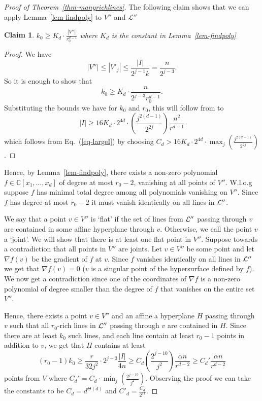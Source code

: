 \documentclass[11pt]{article}
\newtheorem{claim}[thm]{Claim}
\def\L{{\mathcal L}}
\def\C{{\mathbb{C}}}
\def\cL{{\cal L}}
\begin{document}
\begin{proof}[Proof of Theorem~\ref{thm-manyrichlines}]
The following claim shows that we can apply Lemma~\ref{lem-findpoly} to $V''$ and $\L''$
\begin{claim} $k_0\ge K_d\cdot\frac{|V''|}{r_0^{d-1}}$ where $K_d$ is the constant in Lemma~\ref{lem-findpoly}
\end{claim}
\begin{proof}
We have
$$|V''|\le |V'_j| \le \frac{|I|}{2^{j-1}k}=\frac{n}{2^{j-3}}.$$  So it is enough to show that 
$$k_0\ge K_d\cdot\frac{ n}{2^{j-3} r_0^{d-1}}.$$
Substituting the bounds we have  for $k_0$ and $r_0$, this will follow from to $$|I| \ge 16K_d\cdot 2^{4d}\cdot \left(\frac{j^{2(d-1)}}{2^{2j}}\right) \frac{n^2}{r^{d-1}}$$ which follows from Eq.~(\ref{eq-largeI}) by choosing $C_d>16K_d\cdot 2^{4d}\cdot \max_j\left(\frac{j^{2(d-1)}}{2^{2j}}\right)$.
\end{proof} 
Hence, by Lemma~\ref{lem-findpoly}, there exists a non-zero polynomial $f \in \C[x_1,\ldots,x_d]$ of degree at most $r_0-2$, vanishing at all points of $V''$. W.l.o.g suppose $f$ has minimal total degree among all polynomials vanishing on $V''$. Since $f$ has degree at most $r_0-2$ it must vanish identically on all lines in $\cL''$.

We say that a point $v \in V''$ is `flat' if the set  of lines from $\cL''$ passing through $v$ are contained in some affine hyperplane through $v$. Otherwise, we call the point $v$ a `joint'. We will show that there is at least one flat point in $V''$. Suppose towards a contradiction that all points in $V''$ are joints. Let $v \in V''$ be some point and let $\nabla f(v)$ be the gradient of $f$ at $v$. Since $f$ vanishes identically on all lines in $\cL''$ we get that $\nabla f(v)=0$ ($v$ is a singular point of the hypersurface defined by $f$). We now get a contradiction since one of the coordinates of $\nabla f$ is a non-zero polynomial of degree smaller than the degree of $f$ that vanishes on the entire set $V''$. 

Hence, there exists a point $v \in V''$ and an affine a hyperplane $H$ passing through $v$ such that all $r_0$-rich lines in $\cL''$ passing through $v$ are contained in $H$. Since there are at least $k_0$ such lines, and each line contain at least $r_0-1$ points in addition to $v$, we get that $H$ contains at least $$(r_0-1)k_0 \geq \frac{r}{32j^2}\cdot 2^{j-3}\frac{|I|}{4n} \ge C_d \left(\frac{2^{j-10}}{j^2}\right) \frac{\alpha n}{r^{d-2}}\ge C_d' \frac{\alpha n}{r^{d-2}}$$ points from $V$ where $C_d'= C_d \cdot \min_j \left(\frac{2^{j-10}}{j^2}\right)$. Observing the proof we can take the constants to be $C_d=d^{\Theta(d)}$ and $C'_d=\frac{C_d}{2^{11}}$. 
\end{proof}
\end{document}
